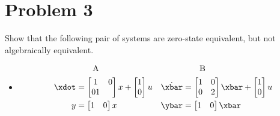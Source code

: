 \documentclass[10pt]{article}
\begin{document}
\section{Problem 3}
 Show that the following pair of systems are zero-state equivalent, but
not algebraically equivalent.
\begin{itemize}
\item 
  \begin{align*}
    &\qquad \text{A} && \qquad\text{B}\\
    \xdot &=
    \begin{bmatrix}
      1 & 0 \\ 0 1
    \end{bmatrix}x + 
    \begin{bmatrix}
      1 \\ 0
    \end{bmatrix}u
    & \dot{\xbar} &=
    \begin{bmatrix}
      1 & 0 \\ 0 & 2 
    \end{bmatrix} \xbar + 
    \begin{bmatrix}
      1 \\ 0
    \end{bmatrix} u\\
    y &= 
    \begin{bmatrix}
      1 & 0 
    \end{bmatrix}x
    & \ybar &=
    \begin{bmatrix}
      1 & 0 
    \end{bmatrix}\xbar
  \end{align*}


\end{itemize}
\end{document}
